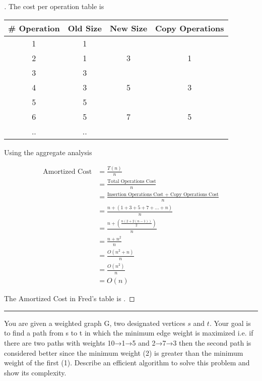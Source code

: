 \documentclass[a4paper, 12pt]{article}
\begin{document}
\begin{proof}[\color{red}{Solution}]
The cost per operation table is
\begin{center}
\begin{tabular}{ |c|c|c|c| } 
 \hline
 \textbf{\# Operation} & \textbf{Old Size} & \textbf{New Size} & \textbf{Copy Operations}  \\
 \hline
 1 & 1 & & \\ 
 \hline
 2 & 1 & 3 & 1 \\ 
 \hline
 3 & 3 & & \\ 
 \hline
 4 & 3 & 5 & 3 \\ 
 \hline
 5 & 5 &  & \\ 
 \hline
 6 & 5 & 7 & 5 \\ 
 \hline
 .. & .. & & \\ 
 \hline
\end{tabular}
\end{center}
\smallskip


Using the aggregate analysis 

\begin{align*} 
    \text{Amortized Cost} &= \frac{T(n)}{n} \\
    &= \frac{\text{Total Operations Cost}}{n} \\
    &= \frac{\text{Insertion Operations Cost + Copy Operations Cost}}{n} \\
    &= \frac{n + (1 + 3 + 5 + 7 + ... + n)}{n} \\
    &= \frac{n + (\frac{n(2 + 2(n-1))}{2})}{n} \tag*{\footnotesize  (Using Arithmetic Series Summation)}\\
    &= \frac{n + n^2}{n} \\
    &= \frac{O(n^2 + n)}{n} \\
    &= \frac{O(n^2)}{n} \\
    &= O(n)
\end{align*}

The Amortized Cost in Fred's table is .
\end{proof}
\bigskip


\hrule
\bigskip
\begin{question}[7]
You are given a weighted graph G, two designated vertices $s$ and $t$. Your goal is to find a
path from s to t in which the minimum edge weight is maximized i.e. if there are two paths with
weights 10→1→5 and 2→7→3 then the second path is considered better since the minimum
weight (2) is greater than the minimum weight of the first (1). Describe an efficient algorithm to
solve this problem and show its complexity. 
\end{question}
\end{document}
